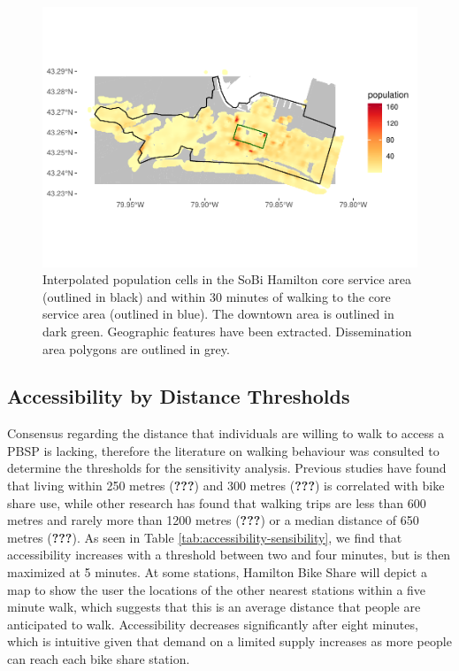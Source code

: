 \documentclass[]{elsarticle} %
\begin{document}
\begin{figure}

{\centering \includegraphics[width=0.65\linewidth]{Bike-share-spatial-equity_files/figure-latex/figure-4-1} 

}

\caption{Interpolated population cells in the SoBi Hamilton core service area (outlined in black) and within 30 minutes of walking to the core service area (outlined in blue). The downtown area is outlined in dark green. Geographic features have been extracted. Dissemination area polygons are outlined in grey.}\label{fig:figure-4}
\end{figure}

\hypertarget{accessibility-by-distance-thresholds}{%
\subsection{Accessibility by Distance
Thresholds}\label{accessibility-by-distance-thresholds}}

Consensus regarding the distance that individuals are willing to walk to
access a PBSP is lacking, therefore the literature on walking behaviour
was consulted to determine the thresholds for the sensitivity analysis.
Previous studies have found that living within 250 metres
({\textbf{???}}) and 300 metres ({\textbf{???}}) is correlated with bike
share use, while other research has found that walking trips are less
than 600 metres and rarely more than 1200 metres ({\textbf{???}}) or a
median distance of 650 metres ({\textbf{???}}). As seen in Table
\ref{tab:accessibility-sensibility}, we find that accessibility
increases with a threshold between two and four minutes, but is then
maximized at 5 minutes. At some stations, Hamilton Bike Share will
depict a map to show the user the locations of the other nearest
stations within a five minute walk, which suggests that this is an
average distance that people are anticipated to walk. Accessibility
decreases significantly after eight minutes, which is intuitive given
that demand on a limited supply increases as more people can reach each
bike share station.
\end{document}
